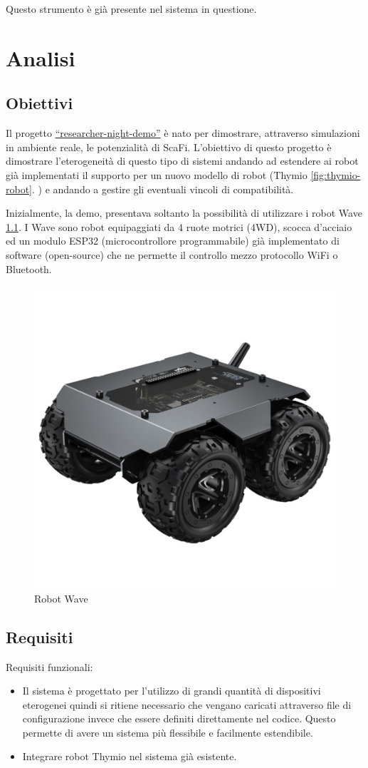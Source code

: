 \documentclass[12pt,a4paper,openright,twoside]{book}
\begin{document}
Questo strumento è già presente nel sistema in questione.

\chapter{Analisi}
\label{chap:analisi}

\section{Obiettivi}
Il progetto \href{https://github.com/cric96/researcher-night-demo.git}{``researcher-night-demo''} è nato per dimostrare, attraverso simulazioni in ambiente reale, le potenzialità di ScaFi. L'obiettivo di questo progetto è dimostrare l'eterogeneità di questo tipo di sistemi andando ad estendere ai robot già implementati il supporto per un nuovo modello di robot (Thymio \cref{fig:thymio-robot}. ) e andando a gestire gli eventuali vincoli di compatibilità.

Inizialmente, la demo, presentava soltanto la possibilità di utilizzare i robot Wave \cref{fig:wave-robot}. I Wave sono robot equipaggiati da 4 ruote motrici (4WD), scocca d'acciaio ed un modulo ESP32 (microcontrollore programmabile) già implementato di software (open-source) che ne permette il controllo mezzo protocollo WiFi o Bluetooth.

\begin{figure}
    \centering
    \includegraphics[width=.3\linewidth]{figures/wave-robot.jpg}
    \caption{Robot Wave}
    \label{fig:wave-robot}
\end{figure}

\section{Requisiti}

Requisiti funzionali:
\begin{itemize}
    \item Il sistema è progettato per l'utilizzo di grandi quantità di dispositivi eterogenei quindi si ritiene necessario che vengano caricati attraverso file di configurazione invece che essere definiti direttamente nel codice. Questo permette di avere un sistema più flessibile e facilmente estendibile.
    \item Integrare robot Thymio nel sistema già esistente.
\end{itemize}
\end{document}
